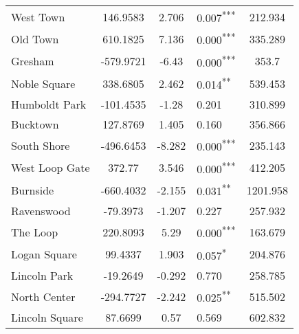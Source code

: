 \documentclass[12pt]{report}
\begin{document}
\begin{longtable}{l S[table-format=6.4] S[table-format=3.4] l S[table-format=4.4]}
	West Town                    & 146.9583             & 2.706            & 0.007\textsuperscript{***} & 212.934                           \\
	Old Town                     & 610.1825             & 7.136            & 0.000\textsuperscript{***} & 335.289                           \\
	Gresham                      & -579.9721            & -6.43            & 0.000\textsuperscript{***} & 353.7                             \\
	Noble Square                 & 338.6805             & 2.462            & 0.014\textsuperscript{**}  & 539.453                           \\
	Humboldt Park                & -101.4535            & -1.28            & 0.201                      & 310.899                           \\
	Bucktown                     & 127.8769             & 1.405            & 0.160                      & 356.866                           \\
	South Shore                  & -496.6453            & -8.282           & 0.000\textsuperscript{***} & 235.143                           \\
	West Loop Gate               & 372.77               & 3.546            & 0.000\textsuperscript{***} & 412.205                           \\
	Burnside                     & -660.4032            & -2.155           & 0.031\textsuperscript{**}  & 1201.958                          \\
	Ravenswood                   & -79.3973             & -1.207           & 0.227                      & 257.932                           \\
	The Loop                     & 220.8093             & 5.29             & 0.000\textsuperscript{***} & 163.679                           \\
	Logan Square                 & 99.4337              & 1.903            & 0.057\textsuperscript{*}   & 204.876                           \\
	Lincoln Park                 & -19.2649             & -0.292           & 0.770                      & 258.785                           \\
	North Center                 & -294.7727            & -2.242           & 0.025\textsuperscript{**}  & 515.502                           \\
	Lincoln Square               & 87.6699              & 0.57             & 0.569                      & 602.832                           \\

\end{longtable}
\end{document}
